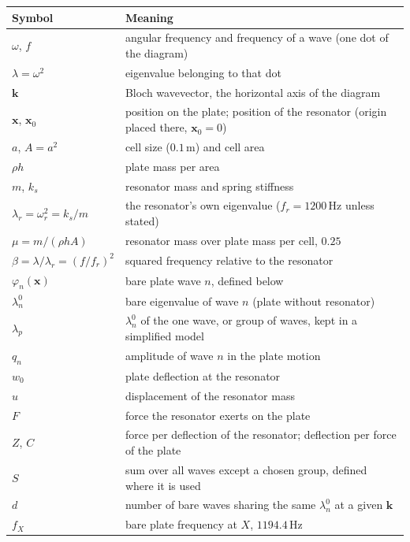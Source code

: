 \begin{center}
\begin{tabular}{|l|p{}|}
\hline
Symbol & Meaning \\
\hline
$\omega$, $f$ & angular frequency and frequency of a wave (one dot of the diagram) \\
$\lambda = \omega^2$ & eigenvalue belonging to that dot \\
$\mathbf{k}$ & Bloch wavevector, the horizontal axis of the diagram \\
$\mathbf{x}$, $\mathbf{x}_0$ & position on the plate; position of the resonator (origin placed there, $\mathbf{x}_0 = 0$) \\
$a$, $A = a^2$ & cell size ($0.1\,\mathrm{m}$) and cell area \\
$\rho h$ & plate mass per area \\
$m$, $k_s$ & resonator mass and spring stiffness \\
$\lambda_r = \omega_r^2 = k_s/m$ & the resonator's own eigenvalue ($f_r = 1200\,\mathrm{Hz}$ unless stated) \\
$\mu = m/(\rho h A)$ & resonator mass over plate mass per cell, $0.25$ \\
$\beta = \lambda/\lambda_r = (f/f_r)^2$ & squared frequency relative to the resonator \\
$\varphi_n(\mathbf{x})$ & bare plate wave $n$, defined below \\
$\lambda_n^0$ & bare eigenvalue of wave $n$ (plate without resonator) \\
$\lambda_p$ & $\lambda_n^0$ of the one wave, or group of waves, kept in a simplified model \\
$q_n$ & amplitude of wave $n$ in the plate motion \\
$w_0$ & plate deflection at the resonator \\
$u$ & displacement of the resonator mass \\
$F$ & force the resonator exerts on the plate \\
$Z$, $C$ & force per deflection of the resonator; deflection per force of the plate \\
$S$ & sum over all waves except a chosen group, defined where it is used \\
$d$ & number of bare waves sharing the same $\lambda_n^0$ at a given $\mathbf{k}$ \\
$f_X$ & bare plate frequency at $X$, $1194.4\,\mathrm{Hz}$ \\
\hline
\end{tabular}
\end{center}

